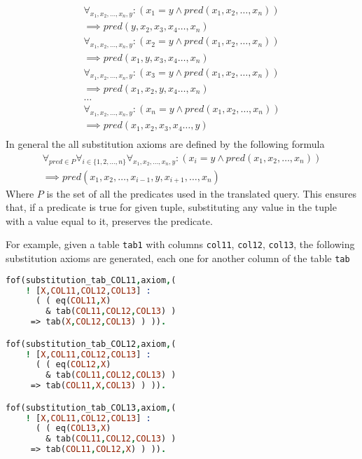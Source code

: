 \documentclass[magisterska,en]{pracamgr}
\newcommand{\code}[1]{\texttt{#1}}
\begin{document}
\begin{align*}
\forall_{x_1, x_2, \dots, x_n, y} : (x_1 = y \land pred(x_1, x_2, \dots, x_n) ) \\
\implies pred(y, x_2, x_3, x_4 \dots, x_n) \\
\forall_{x_1, x_2, \dots, x_n, y} : (x_2 = y \land pred(x_1, x_2, \dots, x_n) ) \\
\implies pred(x_1, y, x_3, x_4 \dots, x_n) \\
\forall_{x_1, x_2, \dots, x_n, y} : (x_3 = y \land pred(x_1, x_2, \dots, x_n) ) \\
\implies pred(x_1, x_2, y, x_4 \dots, x_n) \\
\dots \\
\forall_{x_1, x_2, \dots, x_n, y} : (x_n = y \land pred(x_1, x_2, \dots, x_n) ) \\
\implies pred(x_1, x_2, x_3, x_4 \dots, y) \\
\end{align*}
In general the all substitution axioms are defined by the following formula
\begin{align*}
\forall_{pred \in P} \forall_{i \in \{1, 2, \dots, n\}} \forall_{x_1, x_2, \dots, x_n, y} :(x_i = y \land pred(x_1, x_2, \dots, x_n) ) \\
\implies pred(x_1, x_2, \dots, x_{i-1}, y, x_{i+1}, \dots, x_n)
\end{align*}
Where $P$ is the set of all the predicates used in the translated query. This ensures that, if a predicate is true for given tuple, substituting any value in the tuple with a value equal to it, preserves the predicate.

For example, given a table \code{tab1} with columns \code{col11}, \code{col12}, \code{col13}, the following substitution axioms are generated, each one for another column of the table \code{tab}

\begin{lstlisting}[language=Prolog, caption={TPTP substitution axioms for tables}]
fof(substitution_tab_COL11,axiom,(
    ! [X,COL11,COL12,COL13] :
      ( ( eq(COL11,X)
        & tab(COL11,COL12,COL13) )
     => tab(X,COL12,COL13) ) )). 

fof(substitution_tab_COL12,axiom,(
    ! [X,COL11,COL12,COL13] :
      ( ( eq(COL12,X)
        & tab(COL11,COL12,COL13) )
     => tab(COL11,X,COL13) ) )). 

fof(substitution_tab_COL13,axiom,(
    ! [X,COL11,COL12,COL13] :
      ( ( eq(COL13,X)
        & tab(COL11,COL12,COL13) )
     => tab(COL11,COL12,X) ) )).
\end{lstlisting}
\end{document}
